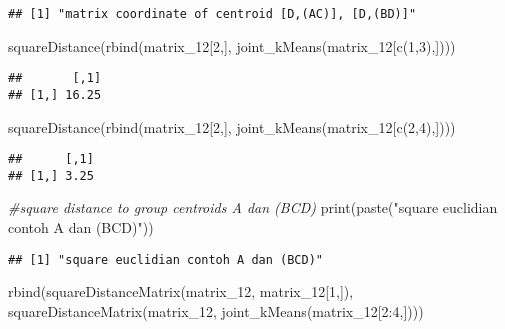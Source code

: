 \documentclass[
]{article}
\newenvironment{Shaded}{\begin{snugshade}}{\end{snugshade}}
\newcommand{\CommentTok}[1]{\textcolor[rgb]{0.56,0.35,0.01}{\textit{#1}}}
\newcommand{\DecValTok}[1]{\textcolor[rgb]{0.00,0.00,0.81}{#1}}
\newcommand{\FunctionTok}[1]{\textcolor[rgb]{0.00,0.00,0.00}{#1}}
\newcommand{\NormalTok}[1]{#1}
\newcommand{\SpecialCharTok}[1]{\textcolor[rgb]{0.00,0.00,0.00}{#1}}
\newcommand{\StringTok}[1]{\textcolor[rgb]{0.31,0.60,0.02}{#1}}
\begin{document}
\begin{verbatim}
## [1] "matrix coordinate of centroid [D,(AC)], [D,(BD)]"
\end{verbatim}

\begin{Shaded}
\begin{Highlighting}[]
\FunctionTok{squareDistance}\NormalTok{(}\FunctionTok{rbind}\NormalTok{(matrix\_12[}\DecValTok{2}\NormalTok{,],}
                     \FunctionTok{joint\_kMeans}\NormalTok{(matrix\_12[}\FunctionTok{c}\NormalTok{(}\DecValTok{1}\NormalTok{,}\DecValTok{3}\NormalTok{),])))}
\end{Highlighting}
\end{Shaded}

\begin{verbatim}
##       [,1]
## [1,] 16.25
\end{verbatim}

\begin{Shaded}
\begin{Highlighting}[]
\FunctionTok{squareDistance}\NormalTok{(}\FunctionTok{rbind}\NormalTok{(matrix\_12[}\DecValTok{2}\NormalTok{,],}
                     \FunctionTok{joint\_kMeans}\NormalTok{(matrix\_12[}\FunctionTok{c}\NormalTok{(}\DecValTok{2}\NormalTok{,}\DecValTok{4}\NormalTok{),])))}
\end{Highlighting}
\end{Shaded}

\begin{verbatim}
##      [,1]
## [1,] 3.25
\end{verbatim}

\begin{Shaded}
\begin{Highlighting}[]
\CommentTok{\#square distance to group centroids A dan (BCD)}
\FunctionTok{print}\NormalTok{(}\FunctionTok{paste}\NormalTok{(}\StringTok{"square euclidian contoh A dan (BCD)"}\NormalTok{))}
\end{Highlighting}
\end{Shaded}

\begin{verbatim}
## [1] "square euclidian contoh A dan (BCD)"
\end{verbatim}

\begin{Shaded}
\begin{Highlighting}[]
\FunctionTok{rbind}\NormalTok{(}\FunctionTok{squareDistanceMatrix}\NormalTok{(matrix\_12, matrix\_12[}\DecValTok{1}\NormalTok{,]), }\FunctionTok{squareDistanceMatrix}\NormalTok{(matrix\_12, }\FunctionTok{joint\_kMeans}\NormalTok{(matrix\_12[}\DecValTok{2}\SpecialCharTok{:}\DecValTok{4}\NormalTok{,])))}
\end{Highlighting}
\end{Shaded}
\end{document}
